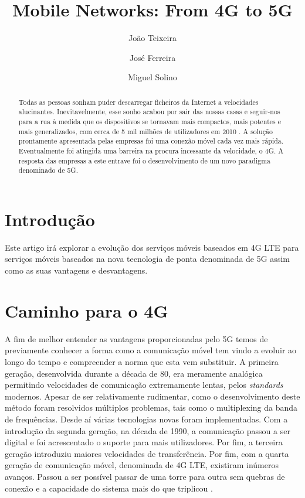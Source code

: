 \documentclass{llncs}
\begin{document}
\mainmatter
\title{Mobile Networks: From 4G to 5G}


\author{João Teixeira \and José Ferreira \and Miguel Solino}



\date{}


\maketitle
\begin{abstract}
Todas as pessoas sonham puder descarregar ficheiros da Internet a
velocidades alucinantes.
Inevitavelmente, esse sonho acabou por sair das nossas casas e
seguir-nos para a rua à medida que os dispositivos se tornavam mais
compactos, mais potentes e mais generalizados, com cerca de 5 mil
milhões de utilizadores em 2010 \cite{Upkar12}.
A solução prontamente apresentada pelas empresas foi uma conexão
móvel cada vez mais rápida.
Eventualmente foi atingida uma barreira na procura incessante da
velocidade, o 4G. A resposta das empresas a este entrave foi o
desenvolvimento de um novo paradigma denominado de 5G.
\end{abstract}

\section{Introdução}

Este artigo irá explorar a evolução dos serviços móveis baseados em 4G
LTE para serviços móveis baseados na nova tecnologia de ponta denominada de 5G assim como as suas vantagens e desvantagens.

\section{Caminho para o 4G}
A fim de melhor entender as vantagens proporcionadas pelo 5G temos
de previamente conhecer a forma como a comunicação móvel tem vindo a
evoluir ao longo do tempo e compreender a norma que esta vem
substituir.
A primeira geração, desenvolvida durante a década de 80, era meramente
analógica permitindo velocidades de comunicação extremamente lentas,
pelos \textit{standards} modernos. Apesar de ser relativamente
rudimentar, como o desenvolvimento deste método foram resolvidos
múltiplos problemas, tais como o multiplexing da banda de frequências.
Desde aí várias tecnologias novas foram implementadas.
Com a introdução da segunda geração, na década de 1990, a comunicação
passou a ser digital e foi acrescentado o suporte para mais
utilizadores. Por fim, a terceira geração introduziu maiores
velocidades de transferência.
Por fim, com a quarta geração de comunicação móvel, denominada de 4G
LTE, existiram inúmeros avanços.
Passou a ser possível passar de uma torre para outra sem quebras de
conexão e a capacidade do sistema mais do que triplicou \cite{Choi06}.
\end{document}
